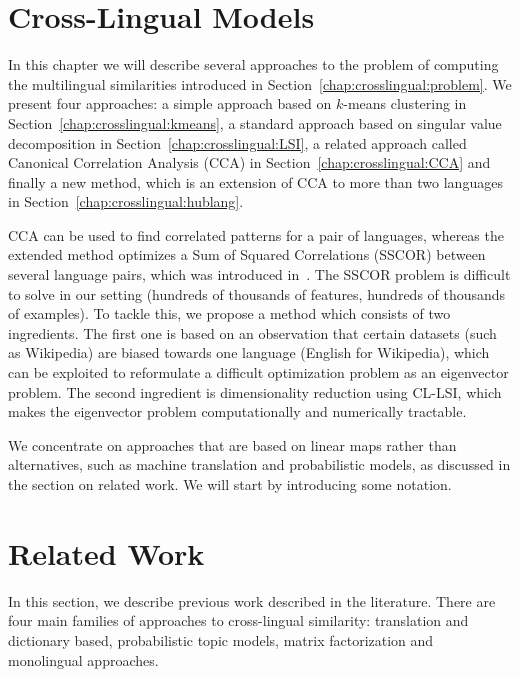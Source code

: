 \section{Cross-Lingual Models}\label{chap:crosslingual:models}
In this chapter we will describe several approaches to the problem of computing the
multilingual similarities introduced in Section~\ref{chap:crosslingual:problem}. We present four approaches:
a simple approach based on $k$-means clustering in Section~\ref{chap:crosslingual:kmeans}, a standard approach
based on singular value decomposition in Section~\ref{chap:crosslingual:LSI}, a related
approach called Canonical Correlation Analysis (CCA) in Section~\ref{chap:crosslingual:CCA} and finally a
new method, which is an extension of CCA to more than two languages in Section~\ref{chap:crosslingual:hublang}.

CCA can be used to find correlated patterns for a pair of languages, whereas the extended method
optimizes a Sum of Squared Correlations (SSCOR) between several language pairs, which was introduced
in~\cite{Kettenring}. The SSCOR problem is difficult to solve in our setting (hundreds of thousands
of features, hundreds of thousands of examples). To tackle this, we propose a method which consists
of two ingredients. The first one is based on an observation that certain datasets (such as Wikipedia)
are biased towards one language (English for Wikipedia), which can be exploited to reformulate a
difficult optimization problem as an eigenvector problem. The second ingredient is dimensionality
reduction using CL-LSI, which makes the eigenvector problem computationally and numerically tractable.

We concentrate on approaches that are based on linear maps rather than alternatives, such as machine
translation and probabilistic models, as discussed in the section on related work. We will start
by introducing some notation.

\section{Related Work}\label{chap:crosslingual:related}
In this section, we describe previous work described  in the literature. There are four main families of approaches to cross-lingual similarity:
translation and dictionary based, probabilistic topic models, matrix factorization and monolingual approaches.


